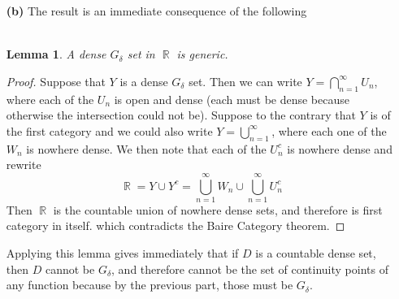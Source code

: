 \documentclass{article}
\DeclareMathOperator{\R}{\mathbb{R}}
\newcommand{\diam}[1]{\text{diam}(#1)}
\newtheorem*{lem}{\\ Lemma}
\begin{document}
\begin{enumerate}
\begin{proof}
    For the second part, note that if $x \in E_n$ then we can find
    some $U$ such that $\diam{U}< \delta$ so that $\diam{f(U)} <
    1/n$. So if $y \in B_{\delta/2}(x)$ then $y \in E_n$ because
    \[
    \sup_{p,q \in B_{\delta/2}(y)}|f(p) - f(q)| \leq \sup_{p,q in
      B_{\delta(x)}} |f(p_ - f(q)| < 1/n
    \]
    So $B_{\delta/2}(x)$ is an open ball containing $x$ that is wholly
    contained in $E_n$, hence $E_n$ is open.
  \end{proof}
  This lemma shows that we can write
  \[
  C = \bigcap_{n=1}^\infty E_{n}
  \]
  where $C$ are the points of continuity of $f$.The first part of the
  lemma says the points int the intersection are precisely the
  continuity points of $f$ and the second part of the lemma verifies
  that this set is a $G_\delta$, as desired.
\item [\textbf{(b)}] The result is an immediate consequence of the following
  \begin{lem}
    A dense $G_\delta$ set in $\R$ is generic.
  \end{lem}
  \begin{proof}
    Suppose that $Y$ is a dense $G_\delta$ set. Then we can write $Y =
    \bigcap_{n=1}^\infty U_n$, where each of the $U_n$ is open and
    dense (each must be dense because otherwise the intersection could
    not be). Suppose to the contrary that $Y$ is of the first category
    and we could also write $Y = \bigcup_{n=1}^\infty$, where each one
    of the $W_n$ is nowhere dense. We then note that each of the
    $U_n^c$ is nowhere dense and rewrite
    \[
    \R = Y \cup Y^c = \bigcup_{n=1}^\infty W_n \cup \bigcup_{n=1}^\infty U_n^c
    \]
    Then $\R$ is the countable union of nowhere dense sets, and
    therefore is first category in itself. which contradicts the Baire
    Category theorem.
  \end{proof}
  Applying this lemma gives immediately that if $D$ is a countable
  dense set, then $D$ cannot be $G_\delta$, and therefore cannot be
  the set of continuity points of any function because by the previous
  part, those must be $G_\delta$.
\end{enumerate}
\hfill\qedsymbol
\end{document}
